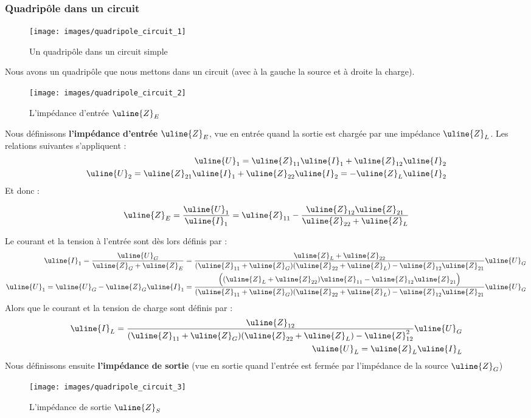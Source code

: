 \documentclass[12pt,a4paper]{article}
\newcommand{\uz}{\uline{Z} }
\newcommand{\ui}{\uline{I} }
\newcommand{\uu}{\uline{U} }
\begin{document}
\subsubsection{Quadripôle dans un circuit}
\begin{figure}[!h]
	\centering
	\texttt{[image: images/quadripole\_circuit\_1]}
	\caption{Un quadripôle dans un circuit simple}
\end{figure}
Nous avons un quadripôle que nous mettons dans un circuit (avec à la gauche la source et à droite la charge).
\begin{figure}[!h]
	\centering
	\texttt{[image: images/quadripole\_circuit\_2]}
	\caption{L'impédance d'entrée $\uz_E$}
\end{figure}
Nous définissons \textbf{l'impédance d'entrée $\uz_E$}, vue en entrée quand la sortie est chargée par une impédance $\uz_L$. Les relations suivantes s'appliquent :
\begin{align*}
	\uu_1 = \uz_{11}\ui_1 + \uz_{12}\ui_2\\
	\uu_2 = \uz_{21}\ui_1 + \uz_{22}\ui_2 = -\uz_L\ui_2
\end{align*}
Et donc :
\begin{boite}[0.6]
	\begin{equation}
		\uz_E = \frac{\uu_1}{\ui_1} = \uz_{11}-\frac{\uz_{12}\uz_{21}}{\uz_{22} + \uz_L}
		\label{equ: quadrip 1}
	\end{equation}
\end{boite}
Le courant et la tension à l'entrée sont dès lors définis par :
\begin{align}
	\ui_1 = \frac{\uu_G}{\uz_G + \uz_E} = \frac{\uz_L + \uz_{22}}{(\uz_{11} + \uz_{G})(\uz_{22} + \uz_{L}) - \uz_{12}\uz_{21}}\uu_G\\
	\uu_1 = \uu_G-\uz_G\ui_1 = \frac{\Big((\uz_L + \uz_{22})\uz_{11} - \uz_{12}\uz_{21}\Big)}{(\uz_{11} + \uz_G)(\uz_{22} + \uz_L) - \uz_{12}\uz_{21}} \uu_G
\end{align}
Alors que le courant et la tension de charge sont définis par :
\begin{align}
	\ui_L = \frac{\uz_{12}}{(\uz_{11} + \uz_G)(\uz_{22}+\uz_L) - \uz_{12}^2} \uu_G\\
	\uu_L = \uz_L\ui_L
\end{align}
Nous définissons ensuite \textbf{l'impédance de sortie} (vue en sortie quand l'entrée est fermée par l'impédance de la source $\uz_G$)
\begin{figure}[!h]
	\centering
	\texttt{[image: images/quadripole\_circuit\_3]}
	\caption{L'impédance de sortie $\uz_S$}
\end{figure}
\end{document}

